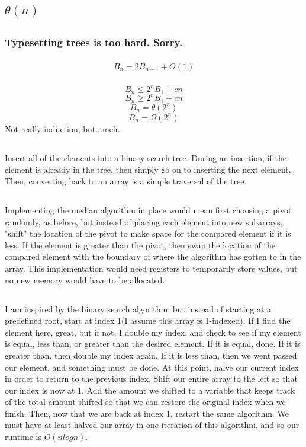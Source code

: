 \documentclass{article}
\begin{document}
\subsection{$\theta(n)$}
\subsection{}
\subsubsection{Typesetting trees is too hard. Sorry.}
\subsubsection{}
$$B_n=2B_{n-1}+O(1)$$
\subsubsection{}
$$B_n \leq 2^nB_1+cn$$
$$B_n \geq 2^nB_1+cn$$
$$B_n=\theta(2^n)$$
$$B_n=\Omega(2^n)$$
Not really induction, but...meh.
\subsection{}Insert all of the elements into a binary search tree. During an insertion, if the element is already in the tree, then simply go on to inserting the next element. Then, converting back to an array is a simple traversal of the tree. 
\subsection{}Implementing the median algorithm in place would mean first choosing a pivot randomly, as before, but instead of placing each element into new subarrays, "shift" the location of the pivot to make space for the compared element if it is less. If the element is greater than the pivot, then swap the location of the compared element with the boundary of where the algorithm has gotten to in the array. This implementation would need registers to temporarily store values, but no new memory would have to be allocated. 
\subsection{}I am inspired by the binary search algorithm, but instead of starting at a predefined root, start at index 1(I assume this array is 1-indexed). If I find the element here, great, but if not, I double my index, and check to see if my element is equal, less than, or greater than the desired element. If it is equal, done. If it is greater than, then double my index again. If it is less than, then we went passed our element, and something must be done. At this point, halve our current index in order to return to the previous index. Shift our entire array to the left so that our index is now at 1. Add the amount we shifted to a variable that keeps track of the total amount shifted so that we can restore the original index when we finish. Then, now that we are back at index 1, restart the same algorithm. We must have at least halved our array in one iteration of this algorithm, and so our runtime is $O(nlogn)$.
\end{document}
